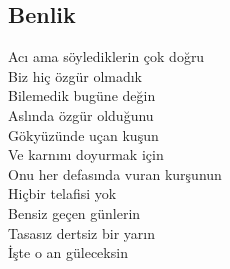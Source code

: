 \subsection{Benlik}

Acı ama söylediklerin çok doğru \\
Biz hiç özgür olmadık \\
Bilemedik bugüne değin \\
Aslında özgür olduğunu \\
Gökyüzünde uçan kuşun \\

\noindent\newline
Ve karnını doyurmak için \\
Onu her defasında vuran kurşunun \\

\noindent\newline
Hiçbir telafisi yok \\
Bensiz geçen günlerin \\
Tasasız dertsiz bir yarın \\
İşte o an güleceksin \\